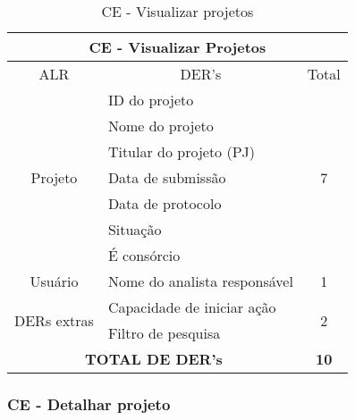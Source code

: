       \begin{table}[!h]
      \centering
      \caption{CE - Visualizar projetos}
      \label{ce_visualizar_projetos}
      \begin{tabular}{|c|l|c|}
      \hline
      \multicolumn{3}{|c|}{CE - Visualizar Projetos}                                                              \\ \hline
      ALR                                                & \multicolumn{1}{c|}{DER's}   & Total              \\ \hline
      \multirow{7}{*}{Projeto}                           & ID do projeto                & \multirow{7}{*}{7} \\ \cline{2-2}
							& Nome do projeto              &                    \\ \cline{2-2}
							& Titular do projeto (PJ)      &                    \\ \cline{2-2}
							& Data de submissão            &                    \\ \cline{2-2}
							& Data de protocolo            &                    \\ \cline{2-2}
							& Situação                     &                    \\ \cline{2-2}
							& É consórcio                  &                    \\ \hline
      Usuário                                            & Nome do analista responsável & 1                  \\ \hline
      \multicolumn{1}{|l|}{\multirow{2}{*}{DERs extras}} & Capacidade de iniciar ação   & \multirow{2}{*}{2} \\ \cline{2-2}
      \multicolumn{1}{|l|}{}                             & Filtro de pesquisa             &                    \\ \hline
      \multicolumn{2}{|c|}{\textbf{TOTAL DE DER's}}                                     & \textbf{10}        \\ \hline
      \end{tabular}
      \end{table}
      
   \subsubsection{CE - Detalhar projeto}
   
